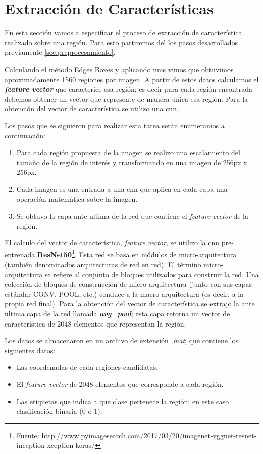 \section{Extracción de Características}\label{sec:extracciondecaracteristica}

En esta sección vamos a especificar el proceso de extracción  de característica realizado sobre una región. Para esto partiremos del los pasos desarrollados previamente \ref{sec:preprocesamiento}.

Calculando el método Edges Boxes y aplicando \ac{nms} vimos que obtuvimos aproximadamente 1560 regiones por imagen. A partir de estos datos calculamos el \textbf{\textit{feature vector}} que caracterice esa región; es decir para cada región encontrada debemos obtener un vector que represente de manera única esa región. Para la obtención del vector de característica se utilizo una \ac{cnn}. 

Los pasos que se siguieron para realizar esta tarea serán enumeramos a continuación:

\begin{enumerate}
	\item Para cada región propuesta de la imagen se realizo una escalamiento del tamaño de la región de interés y  transformando en una imagen de 256px x 256px.
	\item Cada imagen es una entrada a una \ac{cnn} que aplica en cada capa una operación matemática sobre la imagen.
	\item Se obtuvo la capa ante ultima de la red que contiene el \textit{feature vector} de la región. 
\end{enumerate}

El calculo del vector de característica, \textit{feature vector}, se utilizo la \ac{cnn} pre-entrenada \textbf{ResNet50}\footnote{Fuente: http://www.pyimagesearch.com/2017/03/20/imagenet-vggnet-resnet-inception-xception-keras/}. Esta red se basa en módulos de micro-arquitectura (también denominados arquitecturas de red en red). El término micro-arquitectura se refiere al conjunto de bloques utilizados para construir la red. Una colección de bloques de construcción de micro-arquitectura (junto con sus capas estándar CONV, POOL, etc.) conduce a la macro-arquitectura (es decir, a la propia red final). Para la obtención del vector de característica se extrajo la ante ultima capa de la red llamada \textit{\textbf{avg\_pool}}; esta capa retorna un vector de característica de 2048 elementos que representan la región.


Los datos se almacenaron en un archivo de extensión \textit{.mat}; que contiene los siguientes datos:
\begin{itemize}
 \item Las coordenadas de cada regiones candidatas.
 \item El \textit{feature vector} de 2048 elementos que corresponde a cada región. 
 \item Las etiquetas que indica a que clase pertenece la región; en este caso clasificación binaria (0 ó 1).
\end{itemize}



